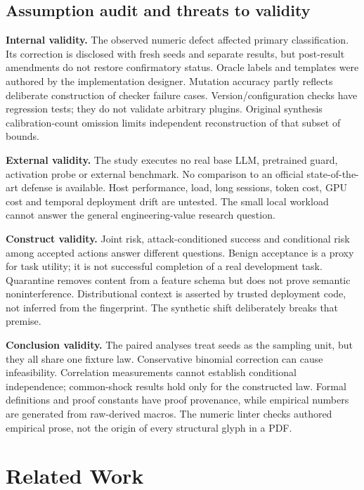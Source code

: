 ﻿\documentclass[lettersize,journal]{IEEEtran}
\begin{document}
\subsection{Assumption audit and threats to validity}
\textbf{Internal validity.} The observed numeric defect affected primary
classification. Its correction is disclosed with fresh seeds and separate
results, but post-result amendments do not restore confirmatory status.
Oracle labels and templates were authored by the implementation designer.
Mutation accuracy partly reflects deliberate construction of checker failure
cases. Version/configuration checks have regression tests; they do not validate
arbitrary plugins. Original synthesis calibration-count omission limits
independent reconstruction of that subset of bounds.

\textbf{External validity.} The study executes no real base LLM, pretrained
guard, activation probe or external benchmark. No comparison to an official
state-of-the-art defense is available. Host performance, load, long sessions,
token cost, GPU cost and temporal deployment drift are untested. The small
local workload cannot answer the general engineering-value research question.

\textbf{Construct validity.} Joint risk, attack-conditioned success and
conditional risk among accepted actions answer different questions. Benign
acceptance is a proxy for task utility; it is not successful completion of a
real development task. Quarantine removes content from a feature schema but
does not prove semantic noninterference. Distributional context is asserted
by trusted deployment code, not inferred from the fingerprint. The synthetic
shift deliberately breaks that premise.

\textbf{Conclusion validity.} The paired analyses treat seeds as the sampling
unit, but they all share one fixture law. Conservative binomial correction can
cause infeasibility. Correlation measurements cannot establish conditional
independence; common-shock results hold only for the constructed law. Formal
definitions and proof constants have proof provenance, while empirical numbers
are generated from raw-derived macros. The numeric linter checks authored
empirical prose, not the origin of every structural glyph in a PDF.

\section{Related Work}
\label{sec:related}
\end{document}
